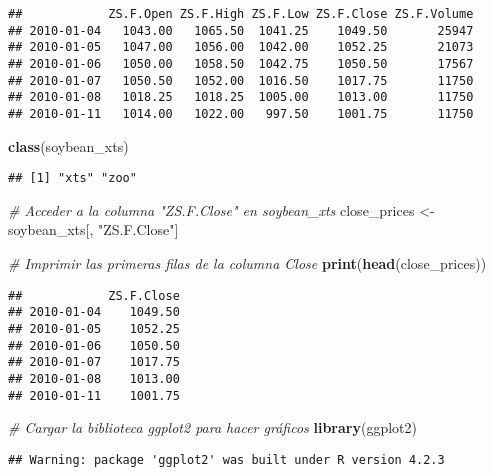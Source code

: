\documentclass[
]{book}
\newenvironment{Shaded}{\begin{snugshade}}{\end{snugshade}}
\newcommand{\CommentTok}[1]{\textcolor[rgb]{0.56,0.35,0.01}{\textit{#1}}}
\newcommand{\FunctionTok}[1]{\textcolor[rgb]{0.13,0.29,0.53}{\textbf{#1}}}
\newcommand{\NormalTok}[1]{#1}
\newcommand{\OtherTok}[1]{\textcolor[rgb]{0.56,0.35,0.01}{#1}}
\newcommand{\StringTok}[1]{\textcolor[rgb]{0.31,0.60,0.02}{#1}}
\begin{document}
\begin{verbatim}
##            ZS.F.Open ZS.F.High ZS.F.Low ZS.F.Close ZS.F.Volume
## 2010-01-04   1043.00   1065.50  1041.25    1049.50       25947
## 2010-01-05   1047.00   1056.00  1042.00    1052.25       21073
## 2010-01-06   1050.00   1058.50  1042.75    1050.50       17567
## 2010-01-07   1050.50   1052.00  1016.50    1017.75       11750
## 2010-01-08   1018.25   1018.25  1005.00    1013.00       11750
## 2010-01-11   1014.00   1022.00   997.50    1001.75       11750
\end{verbatim}

\begin{Shaded}
\begin{Highlighting}[]
\FunctionTok{class}\NormalTok{(soybean\_xts)}
\end{Highlighting}
\end{Shaded}

\begin{verbatim}
## [1] "xts" "zoo"
\end{verbatim}

\begin{Shaded}
\begin{Highlighting}[]
\CommentTok{\# Acceder a la columna "ZS.F.Close" en soybean\_xts}
\NormalTok{close\_prices }\OtherTok{\textless{}{-}}\NormalTok{ soybean\_xts[, }\StringTok{"ZS.F.Close"}\NormalTok{]}

\CommentTok{\# Imprimir las primeras filas de la columna Close}
\FunctionTok{print}\NormalTok{(}\FunctionTok{head}\NormalTok{(close\_prices))}
\end{Highlighting}
\end{Shaded}

\begin{verbatim}
##            ZS.F.Close
## 2010-01-04    1049.50
## 2010-01-05    1052.25
## 2010-01-06    1050.50
## 2010-01-07    1017.75
## 2010-01-08    1013.00
## 2010-01-11    1001.75
\end{verbatim}

\begin{Shaded}
\begin{Highlighting}[]
\CommentTok{\# Cargar la biblioteca ggplot2 para hacer gráficos}
\FunctionTok{library}\NormalTok{(ggplot2)}
\end{Highlighting}
\end{Shaded}

\begin{verbatim}
## Warning: package 'ggplot2' was built under R version 4.2.3
\end{verbatim}
\end{document}
